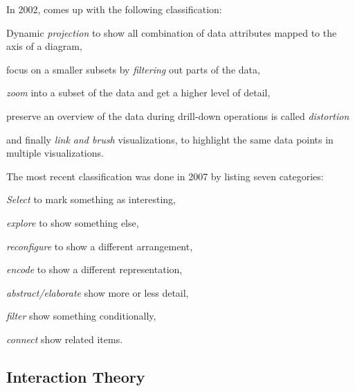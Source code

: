In 2002, \textcite{Keim2002} comes up with the following classification:
\begin{enumerate*}[label=(\arabic*)]
  \item
    Dynamic \emph{projection} to show all combination of data attributes mapped to the axis of a diagram,
  \item
    focus on a smaller subsets by \emph{filtering} out parts of the data,
  \item
    \emph{zoom} into a subset of the data and get a higher level of detail,
  \item
    preserve an overview of the data during drill-down operations is called \emph{distortion}
  \item
    and finally \emph{link and brush} visualizations, to highlight the same data points in multiple visualizations.
\end{enumerate*}

The most recent classification was done in 2007 by \textcite{Yi2007} listing seven categories:
\begin{enumerate*}[label=(\arabic*)]
  \item
    \emph{Select} to mark something as interesting,
  \item
    \emph{explore} to show something else,
  \item
    \emph{reconfigure} to show a different arrangement,
  \item
    \emph{encode} to show a different representation,
  \item
    \emph{abstract/elaborate} show more or less detail,
  \item
    \emph{filter} show something conditionally,
  \item
    \emph{connect} show related items.
\end{enumerate*}


\subsection{Interaction Theory}

